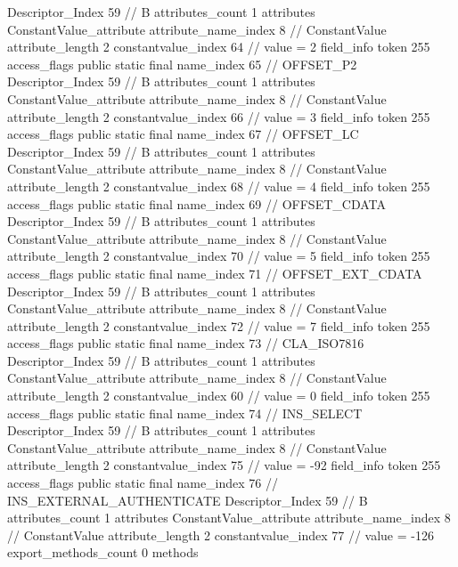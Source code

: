 {{{{{				Descriptor_Index	59		// B
				attributes_count	1
				attributes {
				ConstantValue_attribute {
					attribute_name_index	8		// ConstantValue
					attribute_length	2
					constantvalue_index	64		// value = 2
				}
				}
			}
			field_info {
				token	255
				access_flags	public static final
				name_index	65		// OFFSET_P2
				Descriptor_Index	59		// B
				attributes_count	1
				attributes {
				ConstantValue_attribute {
					attribute_name_index	8		// ConstantValue
					attribute_length	2
					constantvalue_index	66		// value = 3
				}
				}
			}
			field_info {
				token	255
				access_flags	public static final
				name_index	67		// OFFSET_LC
				Descriptor_Index	59		// B
				attributes_count	1
				attributes {
				ConstantValue_attribute {
					attribute_name_index	8		// ConstantValue
					attribute_length	2
					constantvalue_index	68		// value = 4
				}
				}
			}
			field_info {
				token	255
				access_flags	public static final
				name_index	69		// OFFSET_CDATA
				Descriptor_Index	59		// B
				attributes_count	1
				attributes {
				ConstantValue_attribute {
					attribute_name_index	8		// ConstantValue
					attribute_length	2
					constantvalue_index	70		// value = 5
				}
				}
			}
			field_info {
				token	255
				access_flags	public static final
				name_index	71		// OFFSET_EXT_CDATA
				Descriptor_Index	59		// B
				attributes_count	1
				attributes {
				ConstantValue_attribute {
					attribute_name_index	8		// ConstantValue
					attribute_length	2
					constantvalue_index	72		// value = 7
				}
				}
			}
			field_info {
				token	255
				access_flags	public static final
				name_index	73		// CLA_ISO7816
				Descriptor_Index	59		// B
				attributes_count	1
				attributes {
				ConstantValue_attribute {
					attribute_name_index	8		// ConstantValue
					attribute_length	2
					constantvalue_index	60		// value = 0
				}
				}
			}
			field_info {
				token	255
				access_flags	public static final
				name_index	74		// INS_SELECT
				Descriptor_Index	59		// B
				attributes_count	1
				attributes {
				ConstantValue_attribute {
					attribute_name_index	8		// ConstantValue
					attribute_length	2
					constantvalue_index	75		// value = -92
				}
				}
			}
			field_info {
				token	255
				access_flags	public static final
				name_index	76		// INS_EXTERNAL_AUTHENTICATE
				Descriptor_Index	59		// B
				attributes_count	1
				attributes {
				ConstantValue_attribute {
					attribute_name_index	8		// ConstantValue
					attribute_length	2
					constantvalue_index	77		// value = -126
				}
				}
			}
			}
			export_methods_count	0
			methods {
}}}}
